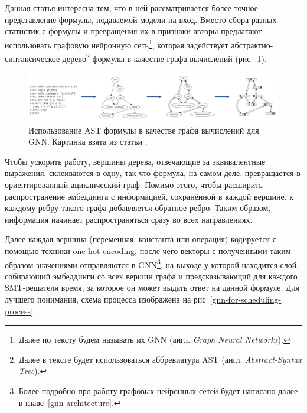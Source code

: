 Данная статья интересна тем, что в ней рассматривается более точное представление формулы, подаваемой модели на вход. Вместо сбора разных статистик с формулы и превращения их в признаки авторы предлагают использовать графовую нейронную сеть\footnote{Далее по тексту будем называть их GNN (англ. \textit{Graph Neural Networks}).}, которая задействует абстрактно-синтаксическое дерево\footnote{Далее в тексте будет использоваться аббревиатура AST (англ. \textit{Abstract-Syntax Tree}).} формулы в качестве графа вычислений (рис.~\ref{gnn-for-scheduling-architecture}).

\begin{figure}[ht]
\begin{center}
    \includegraphics[scale=0.24]{./assets/gnn-for-scheduling-architecture.png}
    \caption{\label{gnn-for-scheduling-architecture} Использование AST формулы в качестве графа вычислений для GNN. Картинка взята из статьи \cite{gnn-for-scheduling-paper}.}
\end{center}
\end{figure}

Чтобы ускорить работу, вершины дерева, отвечающие за эквивалентные выражения, склеиваются в одну, так что формула, на самом деле, превращается в ориентированный ациклический граф. Помимо этого, чтобы расширить распространение эмбеддинга с информацией, сохранённой в каждой вершине, к каждому ребру такого графа добавляется обратное ребро. Таким образом, информация начинает распространяться сразу во всех направлениях.

Далее каждая вершина (переменная, константа или операция) кодируется с помощью техники one-hot-encoding, после чего векторы с полученными таким образом значениями отправляются в GNN\footnote{Более подробно про работу графовых нейронных сетей будет написано далее в главе~\ref{gnn-architecture}.}, на выходе у которой находится слой, собирающий эмбеддинги со всех вершин графа и предсказывающий для каждого SMT-решателя время, за которое он может выдать ответ на данной формуле. Для лучшего понимания, схема процесса изображена на рис~\ref{gnn-for-scheduling-process}.


